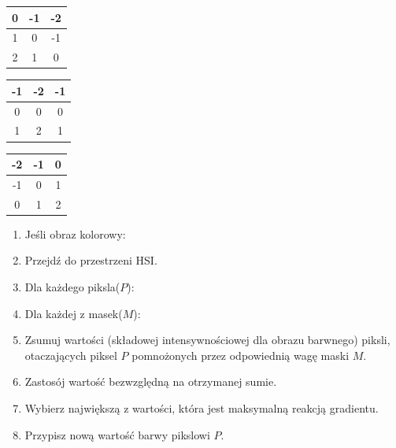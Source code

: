 \documentclass[final,a4paper,openany,12pt]{mwbk}
\begin{document}
\begin{center}
	\begin{tabular}{|c|c|c|}
		\hline
		0 & -1 & -2\\
		\hline
		1 & 0 & -1\\
		\hline
		2 & 1 & 0\\
		\hline
	\end{tabular}
\end{center}

\begin{center}
	\begin{tabular}{|c|c|c|}
		\hline
		-1 & -2 & -1\\
		\hline
		0 & 0 & 0\\
		\hline
		1 & 2 & 1\\
		\hline
	\end{tabular}
\end{center}

\begin{center}
	\begin{tabular}{|c|c|c|}
		\hline
		-2 & -1 & 0\\
		\hline
		-1 & 0 & 1\\
		\hline
		0 & 1 & 2\\
		\hline
	\end{tabular}
\end{center}

\begin{enumerate}
	\item Jeśli obraz kolorowy:
	\item Przejdź do przestrzeni HSI.
	\item Dla każdego piksla($P$):
	\item Dla każdej z masek($M$):
	\item Zsumuj wartości (składowej intensywnościowej dla obrazu barwnego) piksli, otaczających piksel $P$ pomnożonych przez odpowiednią wagę maski $M$.
	\item Zastosój wartość bezwzględną na otrzymanej sumie.
	\item Wybierz największą z wartości, która jest maksymalną reakcją gradientu.
	\item Przypisz nową wartość barwy pikslowi $P$.
\end{enumerate}
\end{document}
